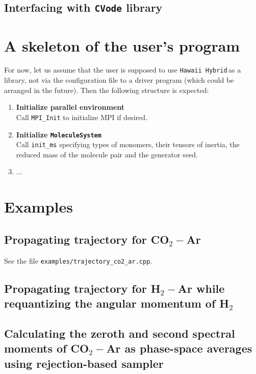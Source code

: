 \documentclass{article}
\newcommand{\libname}{\texttt{Hawaii Hybrid}\,}
\begin{document}
\subsection{Interfacing with \texttt{CVode} library}
\label{subsec:cvode}

\section{A skeleton of the user's program}
\label{sec:user-program}

For now, let us assume that the user is supposed to use \libname as a library, not via the configuration file to a driver program (which could be arranged in the future). Then the following structure is expected:

\begin{enumerate}

\item \textbf{Initialize parallel environment} \\
Call \texttt{MPI\_Init} to initialize MPI if desired.

\item \textbf{Initialize \texttt{MoleculeSystem}} \\
Call \texttt{init\_ms} specifying types of monomers, their tensors of inertia, the reduced mass of the molecule pair and the generator seed.

\item ...

\end{enumerate}


\section{Examples}
\label{sec:examples}

\subsection{Propagating trajectory for CO$_2-$Ar}
\label{subsec:example-trajectory}

See the file \texttt{examples/trajectory\_co2\_ar.cpp}. 

\subsection{Propagating trajectory for H$_2-$Ar while requantizing the angular momentum of H$_2$}
\label{subsec:example-req-trajectory}

\subsection{Calculating the zeroth and second spectral moments of CO$_2-$Ar as phase-space averages using rejection-based sampler}
\label{subsec:example-spmoments-co2-ar}
\end{document}
